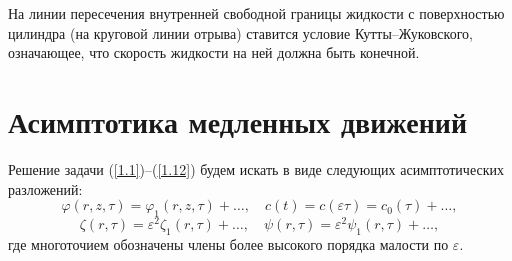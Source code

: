\documentclass[press]{vestnik}
\begin{document}
На линии пересечения внутренней свободной границы жидкости с поверхностью 
цилиндра (на круговой линии отрыва) ставится условие Кутты--Жуковского, 
означающее, что скорость жидкости на ней должна быть конечной.


\section{Асимптотика медленных движений}

Решение задачи (\ref{1.1})--(\ref{1.12}) будем искать в виде следующих асимптотических 
разложений: 
\begin{equation}
\label{eq1}
\varphi (r,z,\tau )=\varphi_{1} (r,z,\tau )+\ldots,
\quad
c(t)=c(\varepsilon \tau )=c_{0} (\tau )+\ldots,
\end{equation}
\begin{equation}
\label{eq2}
\zeta (r,\tau )=\varepsilon^{2}\zeta_{1} (r,\tau )+\ldots,
\quad
\psi (r,\tau )=\varepsilon^{2}\psi_{1} (r,\tau )+\ldots,
\end{equation}
где многоточием обозначены члены более высокого порядка малости по 
$\varepsilon $.
\end{document}
